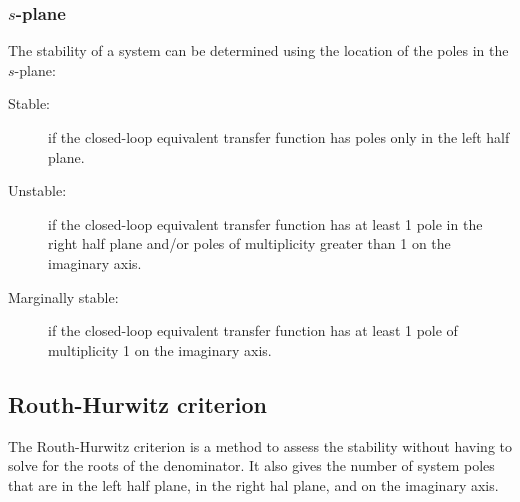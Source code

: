 \documentclass[10pt, twocolumn]{article}
\begin{document}
\subsubsection{\(s\)-plane}
The stability of a system can be determined using the location of the poles in the \(s\)-plane:
\begin{description}
  \item[Stable:] if the closed-loop equivalent transfer function has poles only in the left half plane.
  \item[Unstable:] if the closed-loop equivalent transfer function has at least 1 pole in the right half plane and/or poles of multiplicity greater than 1 on the imaginary axis.
  \item[Marginally stable:] if the closed-loop equivalent transfer function has at least 1 pole of multiplicity 1 on the imaginary axis.
\end{description}


\subsection{Routh-Hurwitz criterion}
The Routh-Hurwitz criterion is a method to assess the stability without having to solve for the roots of the denominator.
It also gives the number of system poles that are in the left half plane, in the right hal plane, and on the imaginary axis.
\end{document}
